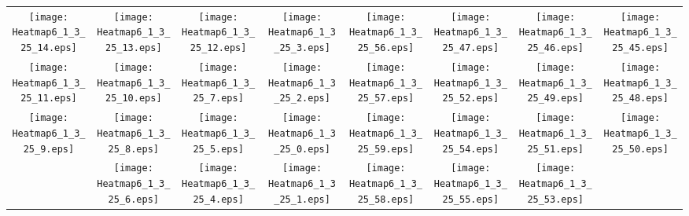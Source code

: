 \documentclass{standalone}
\begin{document}
\begin{tabular}{ *8{c} }
\texttt{[image: Heatmap6\_1\_3\_25\_14.eps]} & \texttt{[image: Heatmap6\_1\_3\_25\_13.eps]} & \texttt{[image: Heatmap6\_1\_3\_25\_12.eps]} & \texttt{[image: Heatmap6\_1\_3\_25\_3.eps]} & \texttt{[image: Heatmap6\_1\_3\_25\_56.eps]} & \texttt{[image: Heatmap6\_1\_3\_25\_47.eps]} & \texttt{[image: Heatmap6\_1\_3\_25\_46.eps]} & \texttt{[image: Heatmap6\_1\_3\_25\_45.eps]} \\
\texttt{[image: Heatmap6\_1\_3\_25\_11.eps]} & \texttt{[image: Heatmap6\_1\_3\_25\_10.eps]} & \texttt{[image: Heatmap6\_1\_3\_25\_7.eps]} & \texttt{[image: Heatmap6\_1\_3\_25\_2.eps]} & \texttt{[image: Heatmap6\_1\_3\_25\_57.eps]} & \texttt{[image: Heatmap6\_1\_3\_25\_52.eps]} & \texttt{[image: Heatmap6\_1\_3\_25\_49.eps]} & \texttt{[image: Heatmap6\_1\_3\_25\_48.eps]} \\
\texttt{[image: Heatmap6\_1\_3\_25\_9.eps]} & \texttt{[image: Heatmap6\_1\_3\_25\_8.eps]} & \texttt{[image: Heatmap6\_1\_3\_25\_5.eps]} & \texttt{[image: Heatmap6\_1\_3\_25\_0.eps]} & \texttt{[image: Heatmap6\_1\_3\_25\_59.eps]} & \texttt{[image: Heatmap6\_1\_3\_25\_54.eps]} & \texttt{[image: Heatmap6\_1\_3\_25\_51.eps]} & \texttt{[image: Heatmap6\_1\_3\_25\_50.eps]} \\
 & \texttt{[image: Heatmap6\_1\_3\_25\_6.eps]} & \texttt{[image: Heatmap6\_1\_3\_25\_4.eps]} & \texttt{[image: Heatmap6\_1\_3\_25\_1.eps]} & \texttt{[image: Heatmap6\_1\_3\_25\_58.eps]} & \texttt{[image: Heatmap6\_1\_3\_25\_55.eps]} & \texttt{[image: Heatmap6\_1\_3\_25\_53.eps]} &  
\end{tabular}
\end{document}
